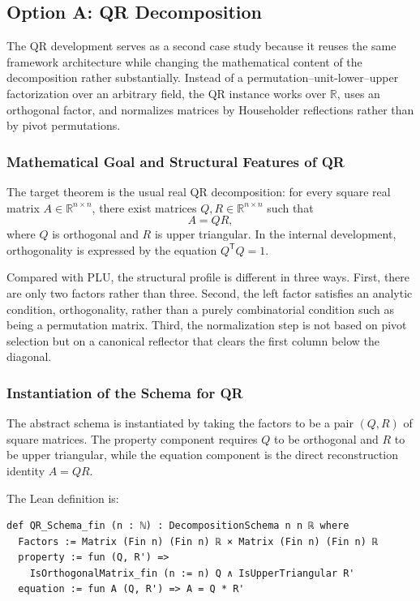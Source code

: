 \documentclass[pdflatex,sn-mathphys-num]{sn-jnl}%
\theoremstyle{thmstyleone}%
\theoremstyle{thmstyletwo}%
\theoremstyle{thmstylethree}%
\begin{document}
\subsection{Option A: QR Decomposition}
The QR development serves as a second case study because it reuses the same framework architecture while changing the mathematical content of the decomposition rather substantially.  Instead of a permutation--unit-lower--upper factorization over an arbitrary field, the QR instance works over \(\mathbb{R}\), uses an orthogonal factor, and normalizes matrices by Householder reflections rather than by pivot permutations.

\subsubsection{Mathematical Goal and Structural Features of QR}
The target theorem is the usual real QR decomposition: for every square real matrix \(A\in\mathbb{R}^{n\times n}\), there exist matrices \(Q,R\in\mathbb{R}^{n\times n}\) such that
\[
A = Q R,
\]
where \(Q\) is orthogonal and \(R\) is upper triangular.  In the internal development, orthogonality is expressed by the equation \(Q^{\mathsf T}Q=1\).

Compared with PLU, the structural profile is different in three ways.  First, there are only two factors rather than three.  Second, the left factor satisfies an analytic condition, orthogonality, rather than a purely combinatorial condition such as being a permutation matrix.  Third, the normalization step is not based on pivot selection but on a canonical reflector that clears the first column below the diagonal.

\subsubsection{Instantiation of the Schema for QR}
The abstract schema is instantiated by taking the factors to be a pair \((Q,R)\) of square matrices.  The property component requires \(Q\) to be orthogonal and \(R\) to be upper triangular, while the equation component is the direct reconstruction identity \(A = Q R\).

The Lean definition is:

\begin{lstlisting}
def QR_Schema_fin (n : ℕ) : DecompositionSchema n n ℝ where
  Factors := Matrix (Fin n) (Fin n) ℝ × Matrix (Fin n) (Fin n) ℝ
  property := fun (Q, R') =>
    IsOrthogonalMatrix_fin (n := n) Q ∧ IsUpperTriangular R'
  equation := fun A (Q, R') => A = Q * R'
\end{lstlisting}
\end{document}
